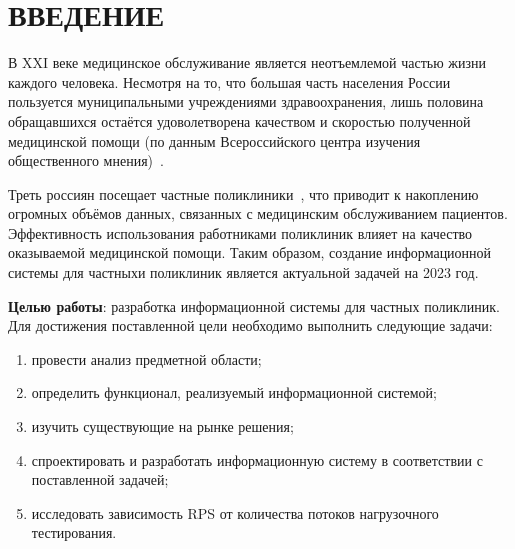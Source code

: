 \section*{ВВЕДЕНИЕ}

В XXI веке медицинское обслуживание является неотъемлемой частью жизни каждого человека. Несмотря на то, что большая часть населения России пользуется муниципальными учреждениями здравоохранения, лишь половина обращавшихся остаётся удоволетворена качеством и скоростью полученной медицинской помощи (по данным Всероссийского центра изучения общественного мнения)~\cite{wciom}.

Треть россиян посещает частные поликлиники~\cite{wciom}, что приводит к накоплению огромных объёмов данных, связанных с медицинским обслуживанием пациентов. 
Эффективность использования работниками поликлиник влияет на качество оказываемой медицинской помощи. 
Таким образом, создание информационной системы для частныхи поликлиник является актуальной задачей на 2023 год.


\textbf{Целью работы}: разработка информационной системы для частных поликлиник.
Для достижения поставленной цели необходимо выполнить следующие задачи:
\begin{enumerate}[label=\arabic*)]
	\item провести анализ предметной области;
	\item определить функционал, реализуемый информационной системой;
	\item изучить существующие на рынке решения;
	\item спроектировать и разработать информационную систему в соответствии с поставленной задачей;
	\item исследовать зависимость RPS от количества потоков нагрузочного тестирования.
\end{enumerate}

